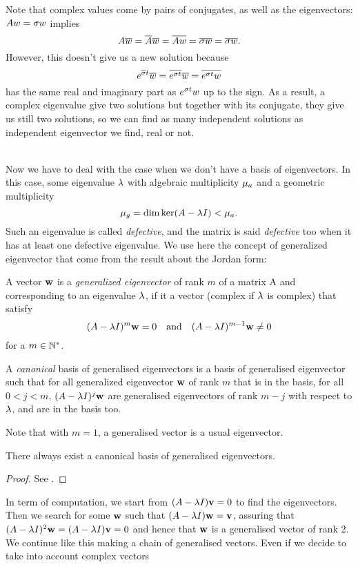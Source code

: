 \begin{remarque}
Note that complex values come by pairs of conjugates, as well as the eigenvectors: \\
$Aw=\sigma w$ implies 
$$A\overline{w} = \overline{A}\overline{w} = \overline{Aw}= \overline{\sigma w} = \overline{\sigma}\overline{w}.$$
However, this doesn't give us a new solution because $$e^{\overline{\sigma} t}\overline{w}= \overline{e^{\sigma t}}\overline{w} = \overline{e^{\sigma t}w}$$
has the same real and imaginary part as $e^{\sigma t}w$ up to the sign. As a result, a complex eigenvalue give two solutions but together with its conjugate, they give us still two solutions, so we can find as many independent solutions as independent eigenvector we find, real or not.
\end{remarque}
\quad \\
Now we have to deal with the case when we don't have a basis of eigenvectors. In this case, some eigenvalue $\lambda$ with algebraic multiplicity $\mu_a$ and a geometric multiplicity
$$\mu_g=\dim\ker(A-\lambda I) < \mu_a.$$
Such an eigenvalue is called \emph{defective}, and the matrix is said \emph{defective} too when it has at least one defective eigenvalue. We use here the concept of generalized eigenvector that come from the result about the Jordan form:

\begin{definition}
    A vector $\mathbf{w}$ is a \emph{generalized eigenvector} of rank $m$  of a matrix A and corresponding to an eigenvalue $\lambda$, if it a vector (complex if $\lambda$ is complex) that satisfy
    $$(A-\lambda I)^m\mathbf{w}=0 \quad\text{and}\quad (A-\lambda I)^{m-1}\mathbf{w}\neq0$$
    for a $m\in\mathbb{N}^*$.
    
    A \emph{canonical} basis of generalised eigenvectors is a basis of generalised eigenvector such that for all generalized eigenvector $\mathbf{w}$ of rank $m$ that is in the basis, for all $0<j<m$, $(A-\lambda I)^j\mathbf{w}$ are generalised eigenvectors of rank $m-j$ with respect to $\lambda$, and are in the basis too.
\end{definition}

Note that with $m=1$, a generalised vector is a usual eigenvector.
    
\begin{theoreme}
    There always exist a canonical basis of generalised eigenvectors.
\end{theoreme}
\begin{proof}
    See .
\end{proof}

In term of computation, we start from $(A-\lambda I)\mathbf{v}=0$ to find the eigenvectors. Then we search for some $\mathbf{w}$ such that $(A-\lambda I)\mathbf{w}=\mathbf{v}$, assuring that $(A-\lambda I)^2\mathbf{w}=(A-\lambda I)\mathbf{v}=0$ and hence that $\mathbf{w}$ is a generalised vector of rank 2. We continue like this making a chain of generalised vectors. Even if we decide to take into account complex vectors

